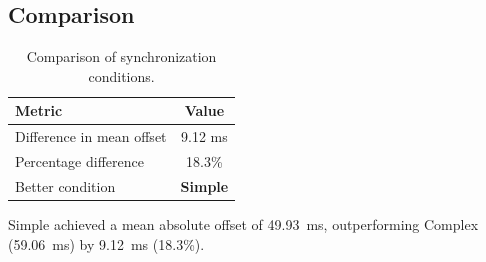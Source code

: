 \subsection*{Comparison}

\begin{table}[h!]
\centering
\begin{tabular}{|l|c|}
\hline
Metric & Value \\
\hline
Difference in mean offset & 9.12 ms \\
Percentage difference & 18.3\% \\
Better condition & \textbf{Simple} \\
\hline
\end{tabular}
\caption{Comparison of synchronization conditions.}
\label{tab:sync_comparison}
\end{table}

Simple achieved a mean absolute offset of 49.93~ms, outperforming Complex (59.06~ms) by 9.12~ms (18.3\%).
